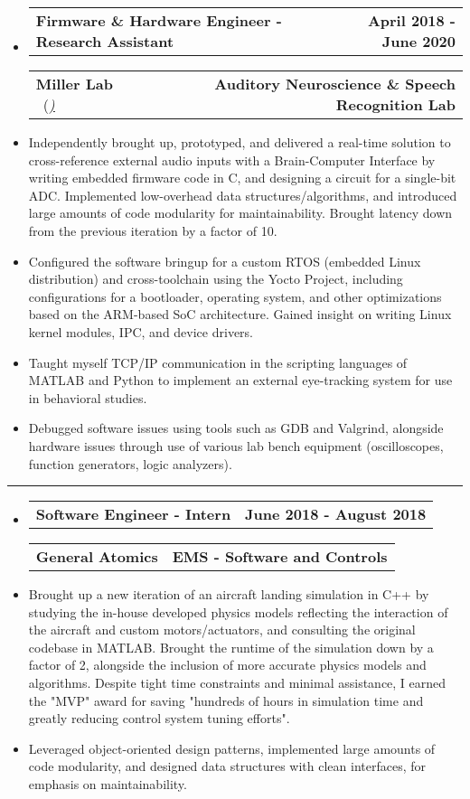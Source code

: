 \documentclass[10pt,letterpaper]{article}
\makeatletter
\newcommand{\header}[2]
{
	\begin{tabular*}{\linewidth}{l @{\extracolsep{\fill}} r}
		\hspace{-27pt} #1 & #2 \\
	\end{tabular*}
}
\makeatother
\begin{document}
\begin{itemize}
	\item[]
		\header
		{\textbf{Firmware \& Hardware Engineer - Research Assistant}} 
		{\textbf{April 2018 - June 2020}}
		\header
		{\textbf{Miller Lab} \ (\href{https://millerlab.faculty.ucdavis.edu}{\small \emph{\underline{\smash{millerlab.faculty.ucdavis.edu})}}} }
		{\textbf{Auditory Neuroscience \& Speech Recognition Lab}} 
	\item
		Independently brought up, prototyped, and delivered a real-time solution to cross-reference external audio inputs with a Brain-Computer Interface by writing embedded firmware code in C, and designing a circuit for a single-bit ADC. Implemented low-overhead data structures/algorithms, and introduced large amounts of code modularity for maintainability. Brought latency down from the previous iteration by a factor of 10. 
	\item 
		Configured the software bringup for a custom RTOS (embedded Linux distribution) and cross-toolchain using the Yocto Project, including configurations for a bootloader, operating system, and other optimizations based on the ARM-based SoC architecture. Gained insight on writing Linux kernel modules, IPC, and device drivers. 
	\item 
		Taught myself TCP/IP communication in the scripting languages of MATLAB and Python to implement an external eye-tracking system for use in behavioral studies.
	\item 
		Debugged software issues using tools such as GDB and Valgrind, alongside hardware issues through use of various lab bench equipment (oscilloscopes, function generators, logic analyzers).
\end{itemize}

\hrule

\begin{itemize}
	\item[]
		\header
		{\textbf{Software Engineer - Intern}} 
		{\textbf{June 2018 - August 2018}}
		\header
		{\textbf{General Atomics}}
		{\textbf{EMS - Software and Controls}} 
	\item
		Brought up a new iteration of an aircraft landing simulation in C++ by studying the in-house developed physics models reflecting the interaction of the aircraft and custom motors/actuators, and consulting the original codebase in MATLAB. Brought the runtime of the simulation down by a factor of 2, alongside the inclusion of more accurate physics models and algorithms. Despite tight time constraints and minimal assistance, I earned the "MVP" award for saving "hundreds of hours in simulation time and greatly reducing control system tuning efforts". 

	\item
		Leveraged object-oriented design patterns, implemented large amounts of code modularity, and designed data structures with clean interfaces, for emphasis on maintainability.


\end{itemize}
\end{document}
